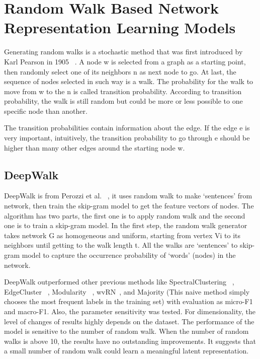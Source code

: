 \section{Random Walk Based Network Representation Learning Models}

Generating random walks is a stochastic method that was first introduced by Karl Pearson in 1905 ~\cite{pearson_problem_1905}. A node w is selected from a graph as a starting point, then randomly select one of its neighbors n as next node to go. At last, the sequence of nodes selected in such way is a walk. The probability for the walk to move from w to the n is called transition probability. According to transition probability, the walk is still random but could be more or less possible to one specific node than another.

The transition probabilities contain information about the edge. If the edge e is very important, intuitively, the transition probability to go through e should be higher than many other edges around the starting node w.

\subsection{DeepWalk}

DeepWalk is from Perozzi et al. ~\cite{perozzi_deepwalk:_2014}, it uses random walk to make ‘sentences’ from network, then train the skip-gram model to get the feature vectors of nodes. The algorithm has two parts, the first one is to apply random walk and the second one is to train a skip-gram model. In the first step, the random walk generator takes network G as homogeneous and uniform, starting from vertex Vi to its neighbors until getting to the walk length t. All the walks are ‘sentences’ to skip-gram model to capture the occurrence probability of ‘words’ (nodes) in the network.

DeepWalk outperformed other previous methods like SpectralClustering ~\cite{von_luxburg_tutorial_2007}, EdgeCluster ~\cite{tang_scalable_2009}, Modularity ~\cite{tang_relational_2009}, wvRN~\cite{Macskassy_a_2003}, and Majority (This naive method simply chooses the most frequent labels in the training set) with evaluation as micro-F1 and macro-F1. Also, the parameter sensitivity was tested. For dimensionality, the level of changes of results highly depends on the dataset. The performance of the model is sensitive to the number of random walk. When the number of random walks is above 10, the results have no outstanding improvements. It suggests that a small number of random walk could learn a meaningful latent representation.

